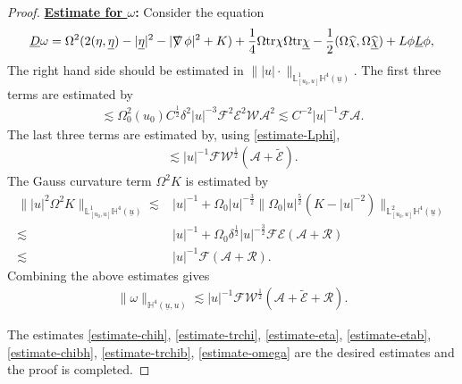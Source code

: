 \documentclass[11pt,reqno]{amsart}
\theoremstyle{definition}
\numberwithin{equation}{section}
\newcommand{\tr}{\mathrm{tr}}
\renewcommand{\L}{\mathbb{L}}
\renewcommand{\H}{\mathbb{H}}
\def\chib{\underline{\chi}}
\def\chibh{\widehat{\underline{\chi}}}
\def\chih{\widehat{\chi}}
\def\etab{\underline{\eta}}
\def\Lb{\underline{L}}
\def\tr{\mathrm{tr}}
\def\ub{\underline{u}}
\newcommand{\Db}{\underline{D}}
\def\ds{\mbox{$\nabla \mkern -13mu /$ }}
\begin{document}
\begin{proof}
{\bf \underline{Estimate for $\omega$}:}  Consider the equation 
\begin{equation}\label{equ-Dbomega}
\Db  \omega =\Omega^2(2(\eta,\etab)-|\etab|^2-|\ds\phi|^2+K)+\frac{1}{4}\Omega\tr \chi\Omega\tr\chib-\frac{1}{2}(\Omega\chih,\Omega\chibh)+L\phi\Lb\phi,
\end{equation}
The right hand side should be estimated in $\||u|\cdot\|_{\L^1_{[u_0,u]}\H^4(\ub)}$. The first three terms are estimated by
\begin{align*}
\lesssim \Omega_0^2(u_0)C^{\frac{1}{2}}\delta^2|u|^{-3}\mathscr{F}^2\mathscr{E}^2\mathscr{W}\mathcal{A}^2\lesssim C^{-2} |u|^{-1}\mathscr{F}\mathcal{A}.
\end{align*}
The last three terms are estimated by, using \eqref{estimate-Lphi},
\begin{align*}
\lesssim|u|^{-1}\mathscr{F}\mathscr{W}^{\frac{1}{2}}(\mathcal{A}+\widetilde{\mathcal{E}}).
\end{align*}
The Gauss curvature term $\Omega^2K$ is estimated by
\begin{align*}
\||u|^2\Omega^2K\|_{\L^1_{[u_0,u]}\H^4(\ub)}\lesssim&|u|^{-1}+\Omega_0|u|^{-\frac{3}{2}}\|\Omega_0|u|^{\frac{5}{2}}(K-|u|^{-2})\|_{\L^2_{[u_0,u]}\H^4(\ub)}\\\lesssim&|u|^{-1}+\Omega_0\delta^{\frac{1}{2}}|u|^{-\frac{3}{2}}\mathscr{F}\mathscr{E}(\mathcal{A}+\mathcal{R})\\
\lesssim&|u|^{-1}\mathscr{F}(\mathcal{A}+\mathcal{R}).
\end{align*}
Combining the above estimates gives
\begin{align}\label{estimate-omega}
\|\omega\|_{\H^4(\ub,u)}\lesssim|u|^{-1}\mathscr{F}\mathscr{W}^{\frac{1}{2}}(\mathcal{A}+\widetilde{\mathcal{E}}+\mathcal{R}).
\end{align}

The estimates \eqref{estimate-chih}, \eqref{estimate-trchi}, \eqref{estimate-eta}, \eqref{estimate-etab}, \eqref{estimate-chibh}, \eqref{estimate-trchib}, \eqref{estimate-omega} are the desired estimates and the proof is completed.\end{proof}
\end{document}
